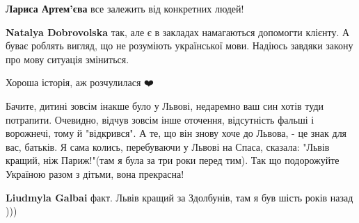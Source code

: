 \begin{itemize}
\begin{itemize}
 
\textbf{Лариса Артем'єва} все залежить від конкретних людей!

 
\textbf{Natalya Dobrovolska} так, але є в закладах намагаються допомогти клієнту. А буває роблять вигляд, що не розуміють української мови. Надіюсь завдяки закону про мову ситуація зміниться.
\end{itemize}

 
Хороша історія, аж розчулилася ❤️

 

Бачите, дитині зовсім інакше було у Львові, недаремно ваш син хотів туди
потрапити. Очевидно, відчув зовсім інше оточення, відсутність фальші і
ворожнечі, тому й "відкрився". А те, що він знову хоче до Львова, - це знак для
вас, батьків. Я сама колись, перебуваючи у Львові на Спаса, сказала: "Львів
кращий, ніж Париж!"(там я була за три роки перед тим). Так що подорожуйте
Україною разом з дітьми, вона прекрасна!

\begin{itemize}
 
\textbf{Liudmyla Galbai} факт. Львів кращий за Здолбунів, там я був шість років назад )))


\end{itemize}
\end{itemize}
